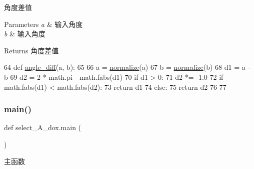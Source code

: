角度差值 


\begin{DoxyParams}{Parameters}
{\em a} & 输入角度 \\
\hline
{\em b} & 输入角度\\
\hline
\end{DoxyParams}
\begin{DoxyReturn}{Returns}
角度差值 
\end{DoxyReturn}

\begin{DoxyCode}
64 \textcolor{keyword}{def }\hyperlink{namespaceselect___a__dox_a2e96d33700cc43f6769c8717a1538684}{angle\_diff}(a, b):
65 
66     a = \hyperlink{namespaceselect___a__dox_a933f572519bc5396421db86a68a37916}{normalize}(a)
67     b = \hyperlink{namespaceselect___a__dox_a933f572519bc5396421db86a68a37916}{normalize}(b)
68     d1 = a - b
69     d2 = 2 * math.pi - math.fabs(d1)
70     \textcolor{keywordflow}{if} d1 > 0:
71         d2 *= -1.0
72     \textcolor{keywordflow}{if} math.fabs(d1) < math.fabs(d2):
73         \textcolor{keywordflow}{return} d1
74     \textcolor{keywordflow}{else}:
75         \textcolor{keywordflow}{return} d2
76 
77 
\end{DoxyCode}
\mbox{\label{namespaceselect___a__dox_a3b1a91ee1ddc60fac7981f8cb5ea0368}} 
\subsubsection{\texorpdfstring{main()}{main()}}
{\footnotesize\ttfamily def select\+\_\+\+A\+\_\+dox.\+main (\begin{DoxyParamCaption}{ }\end{DoxyParamCaption})}



主函数 



